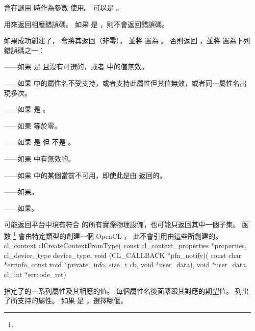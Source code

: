 會在調用  時作為參數  使用。
 可以是 。

 用來返回相應錯誤碼。
如果  是 ，則不會返回錯誤碼。

如果成功創建了， 會將其返回（非零），
並將  置為 。
否則返回 ，並將  置為下列錯誤碼之一：
\startigBase
\item {}——如果  是  且沒有可選的，或者  中的值無效。
\item {}——如果  中的屬性名不受支持，或者支持此屬性但其值無效，或者同一屬性名出現多次。
\item {}——如果  是 。
\item {}——如果  等於零。
\item {}——如果  是  但  不是 。
\item {}——如果  中有無效的。
\item {}——如果  中的某個當前不可用，即使此是由  返回的。
\item {}——如果\scdevfailres。
\item {}——如果\schostfailres。
\stopigBase

\startbuffer[footnotecccft]
 可能返回平台中現有符合  的所有實際物理設備，也可能只返回其中一個子集。
\stopbuffer
函数 \footnote{\getbuffer[footnotecccft]}
會由特定類型的創建一個 OpenCL ，
此不會引用由這些所創建的。
\startclc
cl_context clCreateContextFromType(
		const cl_context_properties *properties,
		cl_device_type device_type,
		void (CL_CALLBACK *pfn_notify)(
			const char *errinfo,
			const void *private_info,
			size_t cb,
			void *user_data),
		void *user_data,
		cl_int *errcode_ret)
\stopclc

 指定了的一系列屬性及其相應的值。
每個屬性名後面緊跟其對應的期望值。
列出了所支持的屬性。
如果  是 ，選擇哪個。

